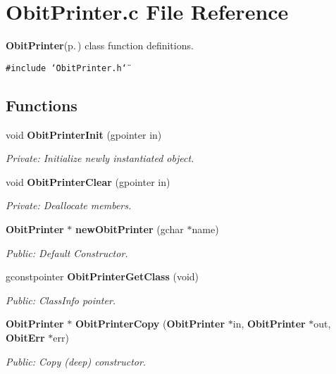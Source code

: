 \section{Obit\-Printer.c File Reference}
\label{ObitPrinter_8c}
{\bf Obit\-Printer}{\rm (p.\,\pageref{structObitPrinter})} class function definitions. 

{\tt \#include \char`\"{}Obit\-Printer.h\char`\"{}}\par
\subsection*{Functions}
\begin{CompactItemize}
\item 
void {\bf Obit\-Printer\-Init} (gpointer in)
\begin{CompactList}\small\item\em Private: Initialize newly instantiated object. \item\end{CompactList}\item 
void {\bf Obit\-Printer\-Clear} (gpointer in)
\begin{CompactList}\small\item\em Private: Deallocate members. \item\end{CompactList}\item 
{\bf Obit\-Printer} $\ast$ {\bf new\-Obit\-Printer} (gchar $\ast$name)
\begin{CompactList}\small\item\em Public: Default Constructor. \item\end{CompactList}\item 
gconstpointer {\bf Obit\-Printer\-Get\-Class} (void)
\begin{CompactList}\small\item\em Public: Class\-Info pointer. \item\end{CompactList}\item 
{\bf Obit\-Printer} $\ast$ {\bf Obit\-Printer\-Copy} ({\bf Obit\-Printer} $\ast$in, {\bf Obit\-Printer} $\ast$out, {\bf Obit\-Err} $\ast$err)
\begin{CompactList}\small\item\em Public: Copy (deep) constructor. \item\end{CompactList}\item 

\end{CompactItemize}
